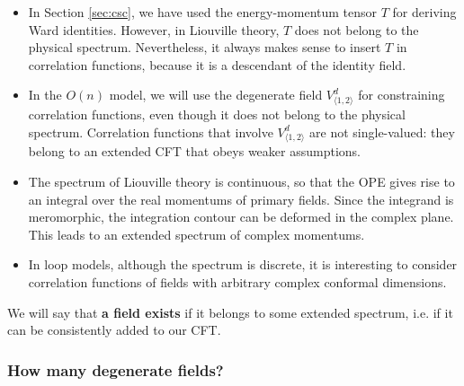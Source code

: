 \documentclass[12pt, a4paper]{article}
\theoremstyle{break}
\begin{document}
\begin{itemize}
 \item In Section \ref{sec:csc}, we have used the energy-momentum tensor $T$ for deriving Ward identities. However, in Liouville theory, $T$ does not belong to the physical spectrum. Nevertheless, it always makes sense to insert $T$ in correlation functions, because it is a descendant of the identity field. 
 \item In the $O(n)$ model, we will use the degenerate field $V^d_{\langle 1,2\rangle}$ for constraining correlation functions, even though it does not belong to the physical spectrum. Correlation functions that involve $V^d_{\langle 1,2\rangle}$ are not single-valued: they belong to an extended CFT that obeys weaker assumptions. 
 \item The spectrum of Liouville theory is continuous, so that the OPE gives rise to an integral over the real momentums of primary fields. Since the integrand is meromorphic, the integration contour can be deformed in the complex plane. This leads to an extended spectrum of complex momentums. 
 \item In loop models, although the spectrum is discrete, it is interesting to consider correlation functions of fields with arbitrary complex conformal dimensions. 
\end{itemize}
We will say that \textbf{a field exists} if it belongs to some extended spectrum, i.e. if it can be consistently added to our CFT. 

\subsubsection{How many degenerate fields?}\label{sec:hmdf}
\end{document}
